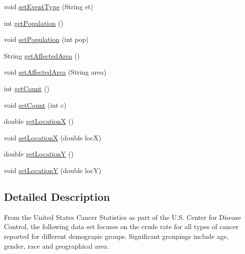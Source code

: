\begin{DoxyCompactItemize}
\item 
void \hyperlink{classbridges_1_1data__src__dependent_1_1_cancer_incidence_a39338b20223e60b79fa38b3034ca46b7}{set\+Event\+Type} (String et)
\item 
int \hyperlink{classbridges_1_1data__src__dependent_1_1_cancer_incidence_a41c2507d46589080f6bb76ab29f53665}{get\+Population} ()
\item 
void \hyperlink{classbridges_1_1data__src__dependent_1_1_cancer_incidence_a9f1caf002b6573aa699a81ed1b835af0}{set\+Population} (int pop)
\item 
String \hyperlink{classbridges_1_1data__src__dependent_1_1_cancer_incidence_ad4c0c709fa5da9c0f20b648052db5f26}{get\+Affected\+Area} ()
\item 
void \hyperlink{classbridges_1_1data__src__dependent_1_1_cancer_incidence_a9c7f2d303da9498e5e6145439c5a6fbc}{set\+Affected\+Area} (String area)
\item 
int \hyperlink{classbridges_1_1data__src__dependent_1_1_cancer_incidence_a8769cb18ddb590dc41a04a220174f3df}{get\+Count} ()
\item 
void \hyperlink{classbridges_1_1data__src__dependent_1_1_cancer_incidence_a18099439ef6e35cf240b06f0e0158c72}{set\+Count} (int c)
\item 
double \hyperlink{classbridges_1_1data__src__dependent_1_1_cancer_incidence_a24aa8144dcacd93a26c3c033471666df}{get\+Location\+X} ()
\item 
void \hyperlink{classbridges_1_1data__src__dependent_1_1_cancer_incidence_a384149c413173fba51adad1b1769797a}{set\+Location\+X} (double loc\+X)
\item 
double \hyperlink{classbridges_1_1data__src__dependent_1_1_cancer_incidence_a53b56a9931a1d02ee356c6258e245aa8}{get\+Location\+Y} ()
\item 
void \hyperlink{classbridges_1_1data__src__dependent_1_1_cancer_incidence_a14c6921a71834c14d561bc7f2aa8a18e}{set\+Location\+Y} (double loc\+Y)
\end{DoxyCompactItemize}


\subsection{Detailed Description}
From the United States Cancer Statistics as part of the U.\+S. Center for Disease Control, the following data set focuses on the crude rate for all types of cancer reported for different demograpic groups. Significant groupings include age, gender, race and geographical area.

